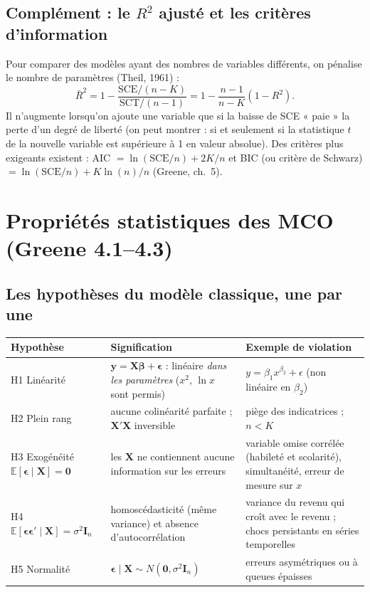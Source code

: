 \documentclass[11pt,a4paper]{article}
\newcommand{\vy}{\mathbf{y}}
\newcommand{\vX}{\mathbf{X}}
\newcommand{\vbeta}{\bm{\beta}}
\newcommand{\veps}{\bm{\epsilon}}
\newcommand{\I}{\mathbf{I}}
\newcommand{\XtX}{\vX'\vX}
\newcommand{\E}{\mathbb{E}}
\begin{document}
\subsection{Complément : le $R^2$ ajusté et les critères d'information}
Pour comparer des modèles ayant des nombres de variables différents, on pénalise le nombre de paramètres (Theil, 1961) :
\[
\bar R^2=1-\frac{\text{SCE}/(n-K)}{\text{SCT}/(n-1)}=1-\frac{n-1}{n-K}(1-R^2).
\]
Il n'augmente lorsqu'on ajoute une variable que si la baisse de SCE « paie » la perte d'un degré de liberté (on peut montrer : si et seulement si la statistique $t$ de la nouvelle variable est supérieure à 1 en valeur absolue). Des critères plus exigeants existent : AIC $=\ln(\text{SCE}/n)+2K/n$ et BIC (ou critère de Schwarz) $=\ln(\text{SCE}/n)+K\ln(n)/n$ (Greene, ch.~5).

\section{Propriétés statistiques des MCO (Greene 4.1--4.3)}

\subsection{Les hypothèses du modèle classique, une par une}
\begin{center}
\renewcommand{\arraystretch}{1.3}
\begin{tabular}{@{}p{3.6cm}p{5.4cm}p{5.6cm}@{}}
\toprule
Hypothèse & Signification & Exemple de violation \\
\midrule
H1 Linéarité & $\vy=\vX\vbeta+\veps$ : linéaire \emph{dans les paramètres} ($x^2$, $\ln x$ sont permis) & $y=\beta_1 x^{\beta_2}+\epsilon$ (non linéaire en $\beta_2$) \\
H2 Plein rang & aucune colinéarité parfaite ; $\XtX$ inversible & piège des indicatrices ; $n<K$ \\
H3 Exogénéité $\E[\veps\mid\vX]=\mathbf 0$ & les $\vX$ ne contiennent aucune information sur les erreurs & variable omise corrélée (habileté et scolarité), simultanéité, erreur de mesure sur $x$ \\
H4 $\E[\veps\veps'\mid\vX]=\sigma^2\I_n$ & homoscédasticité (même variance) et absence d'autocorrélation & variance du revenu qui croît avec le revenu ; chocs persistants en séries temporelles \\
H5 Normalité & $\veps\mid\vX\sim N(\mathbf 0,\sigma^2\I_n)$ & erreurs asymétriques ou à queues épaisses \\
\bottomrule
\end{tabular}
\end{center}
\end{document}
